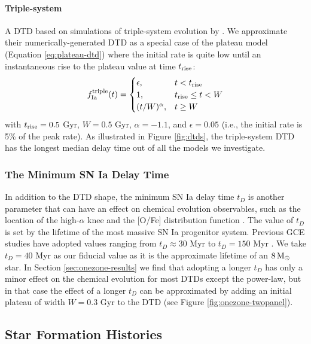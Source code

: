 \documentclass[twocolumn,twocolappendix,linenumbers,trackchanges]{aastex631}
\begin{document}
\paragraph{Triple-system} A DTD based on simulations of triple-system evolution by \citet{Rajamuthukumar2023-TripleEvolution}. We approximate their numerically-generated DTD as a special case of the plateau model (Equation \ref{eq:plateau-dtd}) where the initial rate is quite low until an instantaneous rise to the plateau value at time $t_{\rm rise}$:
\begin{equation}
    f_{\rm Ia}^{\rm triple}(t) =
    \begin{cases}
        \epsilon, & t < t_{\rm rise} \\
        1, & t_{\rm rise} \leq t < W \\
        (t / W) ^ \alpha, & t \geq W
    \end{cases}
    \label{eq:triple-dtd}
\end{equation}
with $t_{\rm rise}=0.5$ Gyr, $W=0.5$ Gyr, $\alpha=-1.1$, and $\epsilon=0.05$ (i.e., the initial rate is 5\% of the peak rate). As illustrated in Figure \ref{fig:dtds}, the triple-system DTD has the longest median delay time out of all the models we investigate.

\subsubsection{The Minimum SN Ia Delay Time}

In addition to the DTD shape, the minimum SN Ia delay time $t_D$ is another parameter that can have an effect on chemical evolution observables, such as the location of the high-$\alpha$ knee and the [O/Fe] distribution function \citep[DF;][]{Andrews2017-ChemicalEvolution}. The value of $t_D$ is set by the lifetime of the most massive SN Ia progenitor system. Previous GCE studies have adopted values ranging from $t_D\approx30$ Myr \citep[e.g.,][]{Poulhazan2018-PrecisionPollution} to $t_D=150$ Myr . We take $t_D=40$ Myr as our fiducial value as it is the approximate lifetime of an $8\,{\rm M}_\odot$ star. In Section \ref{sec:onezone-results} we find that adopting a longer $t_D$ has only a minor effect on the chemical evolution for most DTDs except the power-law, but in that case the effect of a longer $t_D$ can be approximated by adding an initial plateau of width $W=0.3$ Gyr to the DTD (see Figure \ref{fig:onezone-twopanel}).

\subsection{Star Formation Histories}
\label{sec:sfh}
\end{document}
